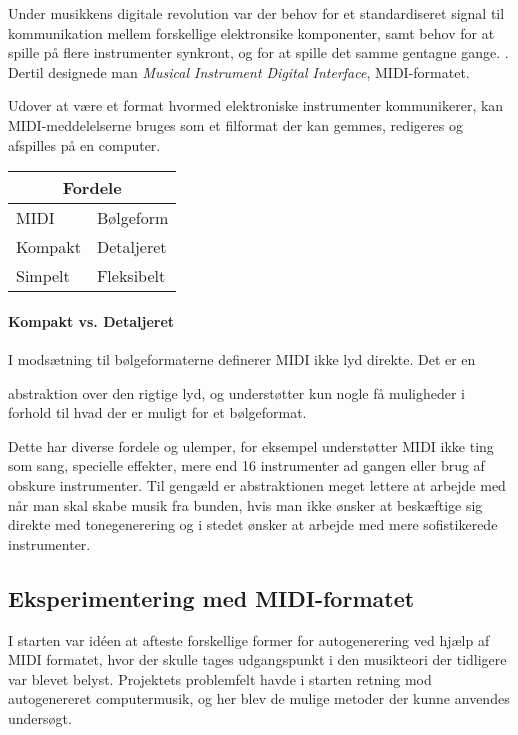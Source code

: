 Under musikkens digitale revolution var der behov for et standardiseret signal til kommunikation mellem forskellige elektronsike komponenter, samt behov for at spille på flere instrumenter synkront, og for at spille det samme gentagne gange.
\cite{Citation Needed}.
Dertil designede man \emph{Musical Instrument Digital Interface}, MIDI-formatet.
 

 

Udover at være et format hvormed elektroniske instrumenter kommunikerer, kan MIDI-meddelelserne bruges som et filformat der kan gemmes, redigeres og afspilles på en computer\cite{Citation Needed}.



\begin{center}
\begin{tabular}{ | l | l | }
	\hline
	\multicolumn{2}{|c|}{Fordele}\\ \hline
	MIDI 		& Bølgeform\\ \hline \hline
	Kompakt 	& Detaljeret\\ \hline
	Simpelt 	& Fleksibelt\\ \hline
\end{tabular}
\end{center}
\paragraph{Kompakt vs.
Detaljeret}

I modsætning til bølgeformaterne definerer MIDI ikke lyd direkte.
Det er en 

abstraktion over den rigtige lyd, og understøtter kun nogle få muligheder i forhold til hvad der er muligt for et bølgeformat.


Dette har diverse fordele og ulemper, for eksempel understøtter MIDI ikke ting som sang, specielle effekter, mere end 16 instrumenter ad gangen eller brug af obskure instrumenter.
Til gengæld er abstraktionen meget lettere at arbejde med når man skal skabe musik fra bunden, hvis man ikke ønsker at beskæftige sig direkte med tonegenerering og i stedet ønsker at arbejde med mere sofistikerede instrumenter.


\subsection {Eksperimentering med MIDI-formatet}

I starten var idéen at afteste forskellige former for autogenerering ved hjælp af MIDI formatet, hvor der skulle tages udgangspunkt i den musikteori der tidligere var blevet belyst.
Projektets problemfelt havde i starten retning mod autogenereret computermusik, og her blev de mulige metoder der kunne anvendes undersøgt.
    

